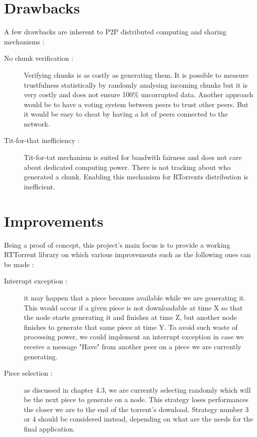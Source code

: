\documentclass[a4paper]{article}
\begin{document}
{\section{Drawbacks}

A few drawbacks are inherent to P2P distributed computing and  sharing mechanisms :\\

\begin{description}
	\item [No chunk verification : ] Verifying chunks is as costly as generating them. It is possible to measure trustfulness statistically by randomly analysing incoming chunks but it is very costly and does not ensure 100\% uncorrupted data. Another approach would be to have a voting system between peers to trust other peers. But it would be easy to cheat by having a lot of peers connected to the network.\\
	\item[Tit-for-that inefficiency : ] Tit-for-tat mechanism is suited for bandwith fairness and does not care about dedicated computing power. There is not tracking about who generated a chunk. Enabling this mechanism for RTorrents distribution is inefficient.
\end{description}

\section{Improvements}

Being a proof of concept, this project's main focus is to provide a working RTTorrent library on which various improvements such as the following ones can be made :\\

\begin{description}
	\item [Interrupt exception : ] it may happen that a piece becomes available while we are generating it. This would occur if a given piece is not downloadable at time X so that the node starts generating it and finishes at time Z, but another node finishes to generate that same piece at time Y. To avoid such waste of processing power, we could implement an interrupt exception in case we receive a message "Have" from another peer on a piece we are currently generating.\\
	
	\item [Piece selection : ] as discussed in chapter 4.3, we are currently selecting randomly which will be the next piece to generate on a node. This strategy loses performances the closer we are to the end of the torrent's download. Strategy number 3 or 4 should be considered instead, depending on what are the needs for the final application.\\
	

\end{description}}
\end{document}
